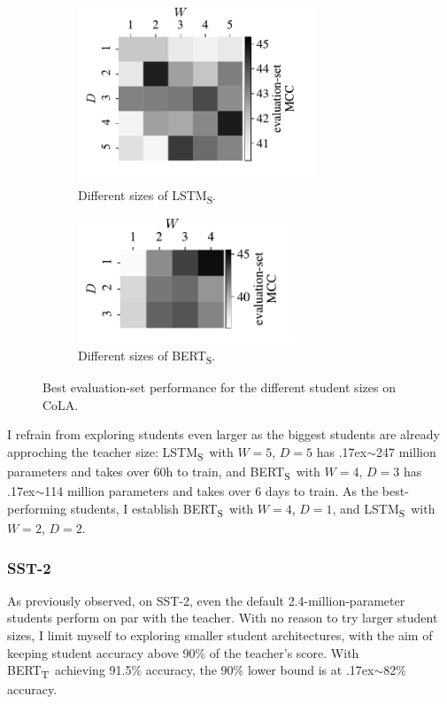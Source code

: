 \documentclass[bsc,frontabs,twoside,singlespacing,parskip,deptreport]{infthesis}
\def\mytilde{{\raise.17ex\hbox{$\scriptstyle\sim$}}}
\def\BERTT{BERT\textsubscript{T}}
\def\BERTS{BERT\textsubscript{S}}
\def\LSTMS{LSTM\textsubscript{S}}
\begin{document}
{{{{        \begin{figure}
          \centering
          \begin{subfigure}{.5\textwidth}
            \centering
            \includegraphics[width=7cm]{../experiments/analysis/img/size-cola-lstm-map}
            \caption{Different sizes of \LSTMS.}
            \label{fig:size-cola-lstm}
          \end{subfigure}%
          \begin{subfigure}{.5\textwidth}
            \centering
            \includegraphics[width=6.5cm]{../experiments/analysis/img/size-cola-bert-map}
            \caption{Different sizes of \BERTS.}
            \label{fig:size-cola-bert}
          \end{subfigure}
          \caption{Best evaluation-set performance for the different student sizes on CoLA.}
          \label{fig:size-cola}
        \end{figure}
        
        I refrain from exploring students even larger as the biggest students are already approching the teacher size: \LSTMS~with $W=5$, $D=5$ has \mytilde247 million parameters and takes over 60h to train, and \BERTS~with $W=4$, $D=3$ has \mytilde114 million parameters and takes over 6 days to train.
        As the best-performing students, I establish \BERTS~with $W=4$, $D=1$, and \LSTMS~with $W=2$, $D=2$.
      }

      \subsubsection{SST-2}{
        As previously observed, on SST-2, even the default 2.4-million-parameter students perform on par with the teacher. With no reason to try larger student sizes, I limit myself to exploring smaller student architectures, with the aim of keeping student accuracy above 90\% of the teacher's score. With \BERTT~achieving 91.5\% accuracy, the 90\% lower bound is at \mytilde82\% accuracy.

}}}}
\end{document}
